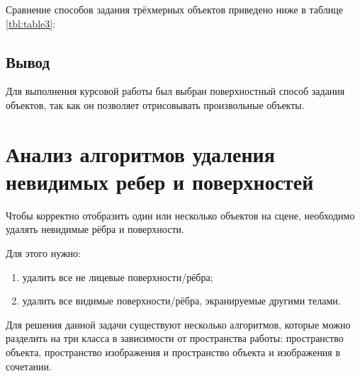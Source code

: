 Сравнение способов задания трёхмерных объектов приведено ниже в таблице \ref{tbl:table3}:


\subsection*{Вывод}

Для выполнения курсовой работы был выбран поверхностный способ задания объектов, так как он позволяет отрисовывать произвольные объекты.

\section{Анализ алгоритмов удаления невидимых ребер и поверхностей}
Чтобы корректно отобразить один или несколько объектов на сцене, необходимо удалять невидимые рёбра и поверхности.

Для этого нужно:
\begin{enumerate}
	\item удалить все не лицевые поверхности/рёбра;
	\item удалить все видимые поверхности/рёбра, экранируемые другими телами.
\end{enumerate}

Для решения данной задачи существуют несколько алгоритмов, которые можно разделить на три класса в зависимости от пространства работы: пространство объекта, пространство изображения и пространство объекта и изображения в сочетании.

